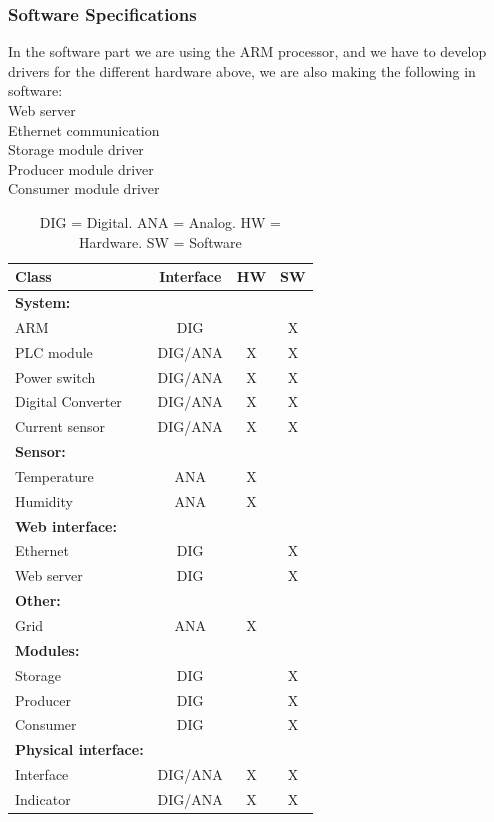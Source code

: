 	\subsubsection{Software Specifications}
	In the software part we are using the ARM processor, and we have to develop drivers for the different hardware above, we are also making the following in software:
	\\Web server
	\\Ethernet communication
	\\Storage module driver
	\\Producer module driver
	\\Consumer module driver
	\begin{table}[h!]
			\begin{tabular}{| l | c | c | c |}
				\hline
	Class							& Interface	& HW	& SW	\\ \hline
	\textbf{System:}				&&&							\\ \hline
	ARM								& DIG		&		& X 	\\ \hline
	PLC module						& DIG/ANA	& X		& X 	\\ \hline
	Power switch					& DIG/ANA	& X		& X 	\\ \hline
	Digital Converter				& DIG/ANA	& X		& X 	\\ \hline
	Current sensor					& DIG/ANA	& X		& X 	\\ \hline
	\textbf{Sensor:}				&&&							\\ \hline
	Temperature						& ANA		& X		& 	 	\\ \hline
	Humidity						& ANA		& X		& 		\\ \hline
	\textbf{Web interface:}			&&&							\\ \hline
	Ethernet						& DIG		& 		& X	 	\\ \hline
	Web server						& DIG		& 		& X		\\ \hline
	\textbf{Other:}					&&&							\\ \hline
	Grid							& ANA		& X		& 	 	\\ \hline
	\textbf{Modules:}				&&&							\\ \hline
	Storage							& DIG		& 		& X	 	\\ \hline
	Producer						& DIG		& 		& X		\\ \hline
	Consumer						& DIG		& 		& X		\\ \hline
	\textbf{Physical interface:}	&&&							\\ \hline
	Interface						& DIG/ANA	& X		& X	 	\\ \hline
	Indicator						& DIG/ANA	& X		& X		\\ \hline
				\end{tabular}
				\caption{DIG = Digital. ANA = Analog. HW = Hardware. SW = Software}
			\end{table}
